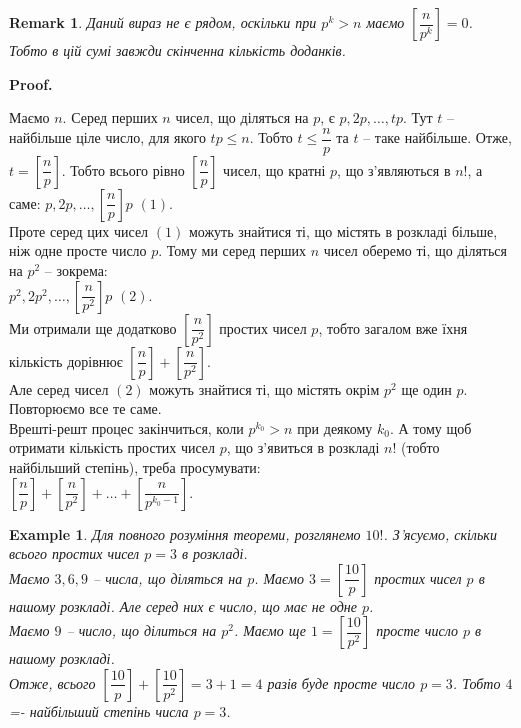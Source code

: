 \documentclass[a4paper, 10pt]{article}
\makeatletter
\theoremstyle{theoremdd}
\theoremstyle{theoremdd}
\theoremstyle{theoremdd}
\theoremstyle{theoremdd}
\newtheorem{example}[theorem]{Example}
\theoremstyle{theoremdd}
\theoremstyle{theoremdd}
\newtheorem{remark}[theorem]{Remark}
\theoremstyle{theoremdd}
\theoremstyle{theoremdd}
\renewenvironment{proof}[1][Proof.\\]{\par
\pushQED{\hfill \qed}%
\normalfont \topsep6\p@\@plus6\p@\relax
\trivlist
\item\relax
{\bfseries
#1\@addpunct{.}}\hspace\labelsep\ignorespaces
}{%
\popQED\endtrivlist\@endpefalse
}
\makeatother
\begin{document}
\begin{remark}
Даний вираз не є рядом, оскільки при $p^k > n$ маємо $\left[ \dfrac{n}{p^k} \right] = 0$. Тобто в цій сумі завжди скінченна кількість доданків.
\end{remark}

\begin{proof}
Маємо $n$. Серед перших $n$ чисел, що діляться на $p$, є $p,2p,\dots,tp$. Тут $t$ -- найбільше ціле число, для якого $tp \leq n$. Тобто $t \leq \dfrac{n}{p}$ та $t$ -- таке найбільше. Отже, $t = \left[ \dfrac{n}{p} \right]$. Тобто всього рівно $\left[ \dfrac{n}{p} \right]$ чисел, що кратні $p$, що з'являються в $n!$, а саме: $p,2p,\dots, \left[ \dfrac{n}{p} \right]p$ $(1)$.\\
Проте серед цих чисел $(1)$ можуть знайтися ті, що містять в розкладі більше, ніж одне просте число $p$. Тому ми серед перших $n$ чисел оберемо ті, що діляться на $p^2$ -- зокрема:\\
$p^2, 2p^2, \dots, \left[ \dfrac{n}{p^2} \right]p$ $(2)$.\\
Ми отримали ще додатково $\left[ \dfrac{n}{p^2} \right]$ простих чисел $p$, тобто загалом вже їхня кількість дорівнює $\left[ \dfrac{n}{p} \right] + \left[ \dfrac{n}{p^2} \right]$.\\
Але серед чисел $(2)$ можуть знайтися ті, що містять окрім $p^2$ ще один $p$. Повторюємо все те саме.\\
Врешті-решт процес закінчиться, коли $p^{k_0} > n$ при деякому $k_0$. А тому щоб отримати кількість простих чисел $p$, що з'явиться в розкладі $n!$ (тобто найбільший степінь), треба просумувати:\\
$\left[ \dfrac{n}{p} \right] + \left[ \dfrac{n}{p^2} \right] + \dots + \left[ \dfrac{n}{p^{k_0-1}} \right]$.
\end{proof}

\begin{example}
Для повного розуміння теореми, розглянемо $10!$. З'ясуємо, скільки всього простих чисел $p = 3$ в розкладі.\\
Маємо $3,6,9$ -- числа, що діляться на $p$. Маємо $3 = \left[ \dfrac{10}{p} \right]$ простих чисел $p$ в нашому розкладі. Але серед них є число, що має не одне $p$.\\
Маємо $9$ -- число, що ділиться на $p^2$. Маємо ще $1 = \left[ \dfrac{10}{p^2} \right]$ просте число $p$ в нашому розкладі.\\
Отже, всього $\left[ \dfrac{10}{p} \right] + \left[ \dfrac{10}{p^2} \right] = 3 + 1 = 4$ разів буде просте число $p = 3$. Тобто $4$ =- найбільший степінь числа $p = 3$.
\end{example}
\end{document}

